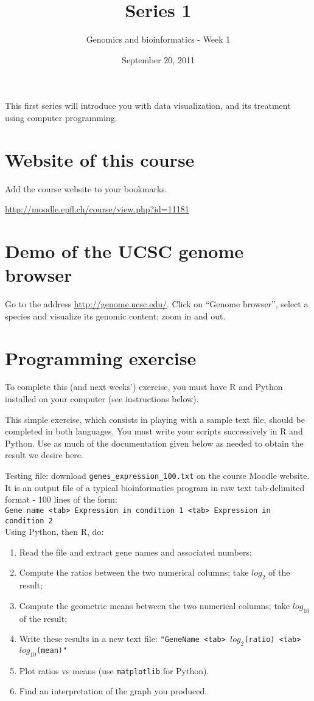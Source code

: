 \documentclass[a4paper,11pt]{article}
\title{Series 1}
\date{September 20, 2011}
\author{Genomics and bioinformatics - Week 1}
\begin{document}
\maketitle

This first series will introduce you with data visualization, and its treatment using computer programming.

\section{Website of this course}
Add the course website to your bookmarks.

\url{http://moodle.epfl.ch/course/view.php?id=11181}

\section{Demo of the UCSC genome browser}
Go to the address \url{http://genome.ucsc.edu/}. Click on ``Genome browser'', select a species
and visualize its genomic content; zoom in and out.

\section{Programming exercise}
To complete this (and next weeks') exercise, you must have R and Python installed on your computer (see instructions below).

This simple exercise, which consists in playing with a sample text file, should be completed in both languages. You must write your scripts successively in R and Python. Use as much of the documentation given below as needed to obtain the result we desire here.

Testing file: download \texttt{genes\_expression\_100.txt} on the course Moodle website. It is an output file of a typical bioinformatics program in raw text tab-delimited format - 100 lines of the form:\\

\texttt{Gene name <tab> Expression in condition 1 <tab> Expression in condition 2}\\

Using Python, then R, do:
\begin{enumerate}
\item Read the file and extract gene names and associated numbers;
\item Compute the ratios between the two numerical columns; take $log_{2}$ of the result;
\item Compute the geometric means between the two numerical columns; take $log_{10}$ of the result;
\item Write these results in a new text file: \texttt{"GeneName <tab> $log_2$(ratio) <tab> $log_{10}$(mean)"}
\item Plot ratios vs means (use  \texttt{matplotlib} for Python).
\item Find an interpretation of the graph you produced.
\end{enumerate}
\end{document}
